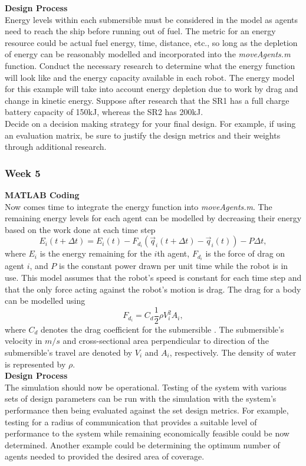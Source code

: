 \documentclass[../CourseManual.tex]{subfiles}
\begin{document}
\textbf{Design Process}\\
Energy levels within each submersible must be considered in the model as agents need to reach the ship before running out of fuel. The metric for an energy resource could be actual fuel energy, time, distance, etc., so long as the depletion of energy can be reasonably modelled and incorporated into the \textit{moveAgents.m} function. Conduct the necessary research to determine what the energy function will look like and the energy capacity available in each robot. The energy model for this example will take into account energy depletion due to work by drag and change in kinetic energy. Suppose after research that the SR1 has a full charge battery capacity of 150kJ, whereas the SR2 has 200kJ.\\

Decide on a decision making strategy for your final design. For example, if using an evaluation matrix, be sure to justify the design metrics and their weights through additional research.

\subsubsection{Week 5} \label{Week 5: Formation}
\textbf{MATLAB Coding}\\
Now comes time to integrate the energy function into \textit{moveAgents.m}. The remaining energy levels for each agent can be modelled by decreasing their energy based on the work done at each time step
\[
E_i(t+\Delta t) = E_i(t) - F_{d_i}(\vec{q}_i(t + \Delta t) - \vec{q}_i(t)) - P \Delta t,
\]
where $E_i$ is the energy remaining for the $i$th agent, $F_{d_i}$ is the force of drag on agent $i$, and $P$ is the constant power drawn per unit time while the robot is in use. This model assumes that the robot's speed is constant for each time step and that the only force acting against the robot's motion is drag. The drag for a body can be modelled using
\[
F_{d_i} = C_d\frac{1}{2}\rho V_i^2 A_i,
\]
where $C_d$ denotes the drag coefficient for the submersible \cite{NASA}. The submersible's velocity in $m/s$ and cross-sectional area perpendicular to direction of the submersible's travel are denoted by $V_i$ and $A_i$, respectively. The density of water is represented by $\rho$.\\

\textbf{Design Process}\\
The simulation should now be operational. Testing of the system with various sets of design parameters can be run with the simulation with the system's performance then being evaluated against the set design metrics. For example, testing for a radius of communication that provides a suitable level of performance to the system while remaining economically feasible could be now determined. Another example could be determining the optimum number of agents needed to provided the desired area of coverage. \\
\end{document}
